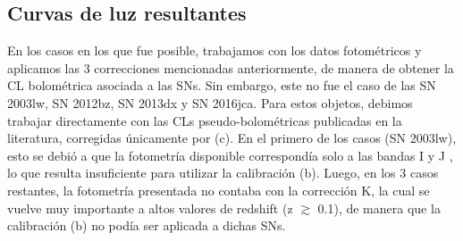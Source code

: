 \documentclass[baaa]{baaa}
\begin{document}
\subsection{Curvas de luz resultantes}\label{sec:resultantes}

En los casos en los que fue posible, trabajamos con los datos fotométricos y aplicamos las 3 correcciones mencionadas anteriormente, de manera de obtener la CL bolométrica asociada a las SNs. Sin embargo, este no fue el caso de las SN 2003lw, SN 2012bz, SN 2013dx y SN 2016jca. Para estos objetos, debimos trabajar directamente con las CLs pseudo-bolométricas publicadas en la literatura, corregidas únicamente por (c). En el primero de los casos (SN 2003lw), esto se debió a que la fotometría disponible correspondía solo a las bandas I y J \citep{Cobb:2004,GalYam:2004}, lo que resulta insuficiente para utilizar la calibración (b).  Luego, en los 3 casos restantes, la fotometría presentada no contaba con la corrección K, la cual se vuelve muy importante a altos valores de redshift (z $\gtrsim$ 0.1), de manera que la calibración (b) no podía ser aplicada a dichas SNs.%
\end{document}
